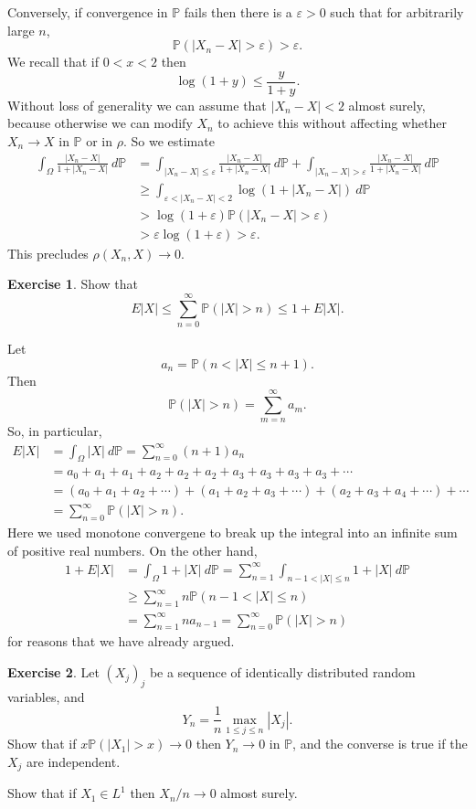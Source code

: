 \documentclass[10pt]{article}
\newcommand{\PP}{\mathbb P}
\theoremstyle{definition}
\newtheorem{exer}{Exercise}
\begin{document}
Conversely, if convergence in $\PP$ fails then there is a $\varepsilon > 0$ such that for arbitrarily large $n$,
$$\PP(|X_n - X| > \varepsilon) > \varepsilon.$$
We recall that if $0 < x < 2$ then
$$\log(1 + y) \leq \frac{y}{1 + y}.$$
Without loss of generality we can assume that $|X_n - X| < 2$ almost surely, because otherwise we can modify $X_n$ to achieve this without affecting whether $X_n \to X$ in $\PP$ or in $\rho$.
So we estimate
\begin{align*}
\int_\Omega \frac{|X_n - X|}{1 + |X_n - X|} ~d\PP &= \int_{|X_n - X| \leq \varepsilon} \frac{|X_n - X|}{1 + |X_n - X|} ~d\PP + \int_{|X_n - X| > \varepsilon} \frac{|X_n - X|}{1 + |X_n - X|} ~d\PP\\
&\geq \int_{\varepsilon < |X_n - X| < 2} \log(1 + |X_n - X|)~d\PP \\
&> \log(1 + \varepsilon) \PP(|X_n - X| > \varepsilon)\\
& > \varepsilon \log(1 + \varepsilon) > \varepsilon.
\end{align*}
This precludes $\rho(X_n, X) \to 0$.

\begin{exer}
Show that
$$E|X| \leq \sum_{n=0}^\infty \PP(|X| > n) \leq 1 + E|X|.$$
\end{exer}

Let
$$a_n = \PP(n < |X| \leq n+1).$$
Then
$$\PP(|X| > n) = \sum_{m=n}^\infty a_m.$$
So, in particular,
\begin{align*}
E|X| &= \int_\Omega |X|~d\PP = \sum_{n=0}^\infty (n+1)a_n\\
&= a_0 + a_1 + a_1 + a_2 + a_2 + a_2 + a_3 + a_3 + a_3 + a_3 + \cdots \\
&= (a_0 + a_1 + a_2 + \cdots) + (a_1 + a_2 + a_3 + \cdots) + (a_2 + a_3 + a_4 + \cdots) + \cdots\\
&= \sum_{n=0}^\infty \PP(|X| > n).
\end{align*}
Here we used monotone convergene to break up the integral into an infinite sum of positive real numbers.
On the other hand,
\begin{align*}
1 + E|X| &= \int_\Omega 1 + |X|~d\PP = \sum_{n=1}^\infty \int_{n-1< |X| \leq n} 1+|X|~d\PP\\
&\geq \sum_{n=1}^\infty n\PP(n-1<|X| \leq n)\\
&= \sum_{n=1}^\infty na_{n-1} =  \sum_{n=0}^\infty \PP(|X| > n)
\end{align*}
for reasons that we have already argued.

\begin{exer}
Let $(X_j)_j$ be a sequence of identically distributed random variables, and
$$Y_n = \frac{1}{n} \max_{1 \leq j \leq n} |X_j|.$$
Show that if $x \PP(|X_1| > x) \to 0$ then $Y_n \to 0$ in $\PP$, and the converse is true if the $X_j$ are independent.

Show that if $X_1 \in L^1$ then $X_n/n \to 0$ almost surely.
\end{exer}
\end{document}
